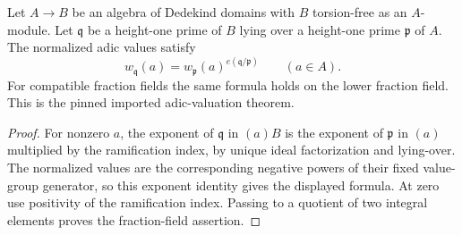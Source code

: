 \begin{theorem}
\label{fw:adic-valuation-extension}
\cite{MathlibRamificationValuation}
\mathlibok
Let $A\to B$ be an algebra of Dedekind domains with $B$ torsion-free
as an $A$-module. Let $\mathfrak q$ be a height-one prime of $B$ lying
over a height-one prime $\mathfrak p$ of $A$. The normalized adic values
satisfy
\[
 w_{\mathfrak q}(a)=w_{\mathfrak p}(a)^{e(\mathfrak q/\mathfrak p)}
 \qquad(a\in A).
\]
For compatible fraction fields the same formula holds on the lower
fraction field. This is the pinned imported adic-valuation theorem.
\end{theorem}
\begin{proof}
For nonzero $a$, the exponent of $\mathfrak q$ in $(a)B$ is the exponent
of $\mathfrak p$ in $(a)$ multiplied by the ramification index, by
unique ideal factorization and lying-over. The normalized values are
the corresponding negative powers of their fixed value-group generator,
so this exponent identity gives the displayed formula. At zero use
positivity of the ramification index. Passing to a quotient of two
integral elements proves the fraction-field assertion.
\end{proof}

